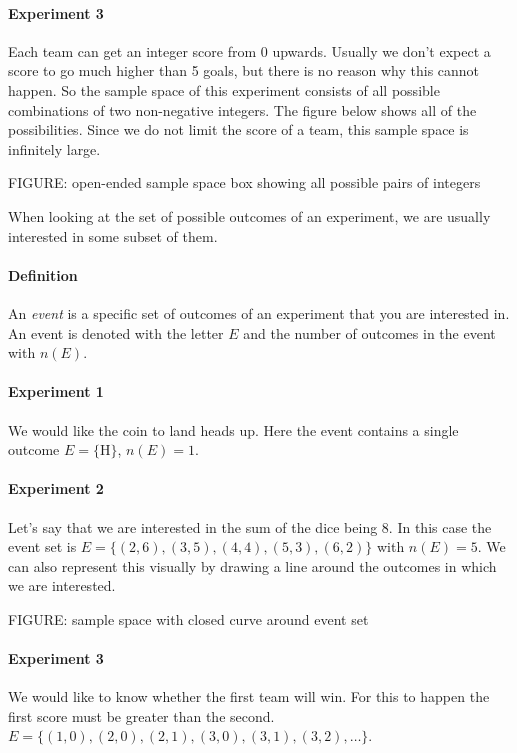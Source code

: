 \documentclass[a4paper,11pt]{report}
\begin{document}
\paragraph{Experiment 3} Each team can get an integer score from 0
upwards. Usually we don't expect a score to go much higher than 5
goals, but there is no reason why this cannot happen. So the sample
space of this experiment consists of all possible combinations of two
non-negative integers. The figure below shows all of the
possibilities. Since we do not limit the score of a team, this sample
space is infinitely large.

FIGURE: open-ended sample space box showing all possible pairs of integers

When looking at the set of possible outcomes of an experiment, we are
usually interested in some subset of them.

\paragraph{Definition} An {\em event} is a specific set of outcomes of
an experiment that you are interested in. An event is denoted with the
letter \(E\) and the number of outcomes in the event with \(n(E)\).

\paragraph{Experiment 1} We would like the coin to land heads up. Here
the event contains a single outcome \(E=\{\textrm{H}\}\), \(n(E)=1\).

\paragraph{Experiment 2} Let's say that we are interested in the sum
of the dice being 8. In this case the event set is
\(E=\{(2,6),(3,5),(4,4),(5,3),(6,2)\}\) with \(n(E)=5\). We can also
represent this visually by drawing a line around the outcomes in which
we are interested.

FIGURE: sample space with closed curve around event set

\paragraph{Experiment 3} We would like to know whether the first team
will win. For this to happen the first score must be greater than the
second. \(E=\{(1,0),(2,0),(2,1),(3,0),(3,1),(3,2),\ldots\}\).
\end{document}
